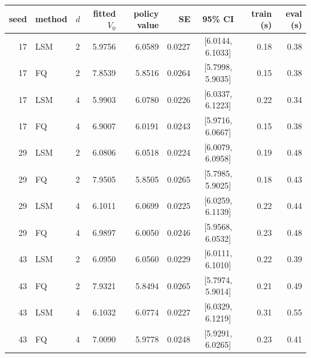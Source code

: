 \begin{tabular}{rllrrrcrr}
\toprule
seed & method & $d$ & fitted $V_0$ & policy value & SE & 95\% CI & train (s) & eval (s) \\
\midrule
17 & LSM & 2 & 5.9756 & 6.0589 & 0.0227 & [6.0144, 6.1033] & 0.18 & 0.38 \\
17 & FQ & 2 & 7.8539 & 5.8516 & 0.0264 & [5.7998, 5.9035] & 0.15 & 0.38 \\
17 & LSM & 4 & 5.9903 & 6.0780 & 0.0226 & [6.0337, 6.1223] & 0.22 & 0.34 \\
17 & FQ & 4 & 6.9007 & 6.0191 & 0.0243 & [5.9716, 6.0667] & 0.15 & 0.38 \\
\midrule
29 & LSM & 2 & 6.0806 & 6.0518 & 0.0224 & [6.0079, 6.0958] & 0.19 & 0.48 \\
29 & FQ & 2 & 7.9505 & 5.8505 & 0.0265 & [5.7985, 5.9025] & 0.18 & 0.43 \\
29 & LSM & 4 & 6.1011 & 6.0699 & 0.0225 & [6.0259, 6.1139] & 0.22 & 0.44 \\
29 & FQ & 4 & 6.9897 & 6.0050 & 0.0246 & [5.9568, 6.0532] & 0.23 & 0.48 \\
\midrule
43 & LSM & 2 & 6.0950 & 6.0560 & 0.0229 & [6.0111, 6.1010] & 0.22 & 0.39 \\
43 & FQ & 2 & 7.9321 & 5.8494 & 0.0265 & [5.7974, 5.9014] & 0.21 & 0.49 \\
43 & LSM & 4 & 6.1032 & 6.0774 & 0.0227 & [6.0329, 6.1219] & 0.31 & 0.55 \\
43 & FQ & 4 & 7.0090 & 5.9778 & 0.0248 & [5.9291, 6.0265] & 0.23 & 0.41 \\
\bottomrule
\end{tabular}
